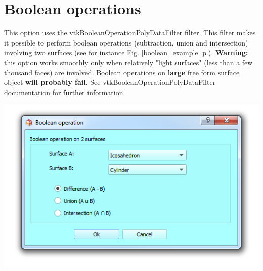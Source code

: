\section{Boolean operations}\label{boolean_operations}
\noindent
\begin{minipage}{0.5\textwidth}
This option uses the vtkBooleanOperationPolyDataFilter filter. This filter makes it possible to perform boolean operations (subtraction, union and intersection) involving two surfaces (see for instance Fig. \ref{boolean_example} p.\pageref{boolean_example}). \textbf{Warning:} this option works smoothly only when relatively "light surfaces" (less than a few thousand faces) are involved. Boolean operations on \textbf{large} free form surface object \textbf{will probably fail}. See vtkBooleanOperationPolyDataFilter documentation for further information.



\end{minipage}    
\begin{minipage}{0.5\textwidth}\centering
  \includegraphics[scale=0.5]{images/09/boolean_operations/boolean_dialog.png}
 \end{minipage} 

